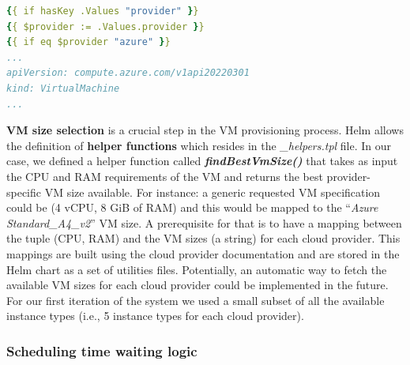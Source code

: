 \vspace{0.5cm}


\vspace{3.0cm}

\begin{lstlisting}[language=yaml, caption={Helm Template guards example}, label={lst:guards}]
{{ if hasKey .Values "provider" }}
{{ $provider := .Values.provider }}
{{ if eq $provider "azure" }}
...
apiVersion: compute.azure.com/v1api20220301
kind: VirtualMachine
...
\end{lstlisting}


\textbf{VM size selection} is a crucial step in the VM provisioning process.
Helm allows the definition of \textbf{helper functions} which resides in the \textit{\_helpers.tpl} file.
In our case, we defined a helper function called \textbf{\textit{findBestVmSize()}} that takes as input the CPU and RAM requirements of the VM and returns the best provider-specific VM size available.
For instance: a generic requested VM specification could be (4 vCPU, 8 GiB of RAM) and this would be mapped to the ``\textit{Azure Standard\_A4\_v2}'' VM size.
A prerequisite for that is to have a mapping between the tuple (CPU, RAM) and the VM sizes (a string) for each cloud provider.
This mappings are built using the cloud provider documentation and are stored in the Helm chart as a set of utilities files.
Potentially, an automatic way to fetch the available VM sizes for each cloud provider could be implemented in the future.
For our first iteration of the system we used a small subset of all the available instance types (i.e., 5 instance types for each cloud provider).

\subsubsection{Scheduling time waiting logic}
\label{sec:scheduling_time_waiting_logic}

